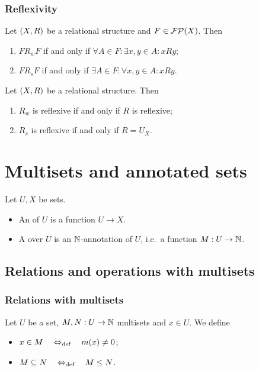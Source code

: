 \subsubsection{Reflexivity}
\begin{lemma}
Let $\sSet{X,R}$ be a relational structure and $F\in \operatorname{\mathcal{FP}}(X)$. Then
\begin{enumerate}
\item $F\mathrel{R_w}F$ \textup{if and only if} $\forall A\in F: \exists x,y\in A: xRy$;
\item $F\mathrel{R_s}F$ \textup{if and only if} $\exists A\in F: \forall x,y\in A: xRy$.
\end{enumerate}
\end{lemma}
\begin{corollary} \label{reflexivityFilterRelations}
Let $\sSet{X,R}$ be a relational structure. Then
\begin{enumerate}
\item $R_w$ is reflexive \textup{if and only if} $R$ is reflexive;
\item $R_s$ is reflexive \textup{if and only if} $R = U_X$.
\end{enumerate}
\end{corollary}


\section{Multisets and annotated sets}
\begin{definition}
Let $U, X$ be sets.
\begin{itemize}
\item An  of $U$ is a function $U\to X$.
\item A  over $U$ is an $\mathbb{N}$-annotation of $U$, i.e.\ a function $M: U\to \mathbb{N}$.
\end{itemize}
\end{definition}

\subsection{Relations and operations with multisets}
\subsubsection{Relations with multisets}
\begin{definition}
Let $U$ be a set, $M,N: U\to \mathbb{N}$ multisets and $x\in U$. We define
\begin{itemize}
\item $x\in M \quad\Leftrightarrow_{\text{def}}\quad m(x) \neq 0$;
\item $M\subseteq N \quad\Leftrightarrow_{\text{def}}\quad M \leq N$.
\end{itemize}
\end{definition}

